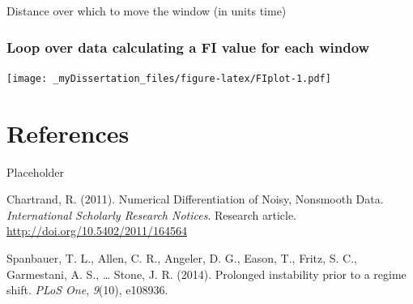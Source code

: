 \documentclass[12pt,twoside,openany]{reedthesis}
\newenvironment{Shaded}{\begin{snugshade}}{\end{snugshade}}
\newcommand{\CommentTok}[1]{\textcolor[rgb]{0.56,0.35,0.01}{\textit{#1}}}
\newcommand{\DataTypeTok}[1]{\textcolor[rgb]{0.13,0.29,0.53}{#1}}
\newcommand{\DecValTok}[1]{\textcolor[rgb]{0.00,0.00,0.81}{#1}}
\newcommand{\KeywordTok}[1]{\textcolor[rgb]{0.13,0.29,0.53}{\textbf{#1}}}
\newcommand{\NormalTok}[1]{#1}
\newcommand{\OperatorTok}[1]{\textcolor[rgb]{0.81,0.36,0.00}{\textbf{#1}}}
\newcommand{\StringTok}[1]{\textcolor[rgb]{0.31,0.60,0.02}{#1}}
\begin{document}
Distance over which to move the window (in units time)
\begin{Shaded}
\end{Shaded}
\hypertarget{loop-over-data-calculating-a-fi-value-for-each-window}{%
\subsection{Loop over data calculating a FI value for each window}\label{loop-over-data-calculating-a-fi-value-for-each-window}}

\texttt{[image: \_myDissertation\_files/figure-latex/FIplot-1.pdf]}

\hypertarget{references}{%
\chapter*{References}\label{references}}

Placeholder

\hypertarget{refs}{}
\leavevmode\hypertarget{ref-chartrand_numerical_2011}{}%
Chartrand, R. (2011). Numerical Differentiation of Noisy, Nonsmooth Data. \emph{International Scholarly Research Notices}. Research article. \url{http://doi.org/10.5402/2011/164564}

\leavevmode\hypertarget{ref-spanbauer_prolonged_2014}{}%
Spanbauer, T. L., Allen, C. R., Angeler, D. G., Eason, T., Fritz, S. C., Garmestani, A. S., \ldots{} Stone, J. R. (2014). Prolonged instability prior to a regime shift. \emph{PLoS One}, \emph{9}(10), e108936.
\end{document}
